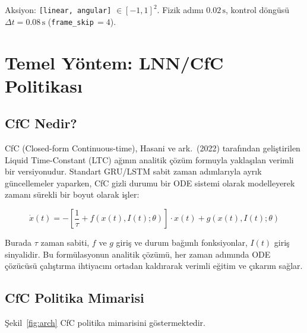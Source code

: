 \documentclass[11pt,a4paper]{article}
\newcommand{\code}[1]{\texttt{#1}}
\begin{document}
Aksiyon: \code{[linear, angular]} $\in [-1, 1]^2$.
Fizik adımı $0.02\,\text{s}$, kontrol döngüsü $\Delta t = 0.08\,\text{s}$
(\code{frame\_skip}$\,=4$).

\section{Temel Yöntem: LNN/CfC Politikası}

\subsection{CfC Nedir?}

CfC (Closed-form Continuous-time), Hasani ve ark.~(2022) tarafından geliştirilen
Liquid Time-Constant (LTC) ağının analitik çözüm formuyla
yaklaşılan verimli bir versiyonudur.
Standart GRU/LSTM sabit zaman adımlarıyla ayrık güncellemeler yaparken,
CfC gizli durumu bir ODE sistemi olarak modelleyerek zamanı sürekli bir boyut
olarak işler:

\begin{equation}
\dot{x}(t) = -\left[\frac{1}{\tau} + f(x(t), I(t); \theta)\right] \cdot x(t)
             + g(x(t), I(t); \theta)
\end{equation}

Burada $\tau$ zaman sabiti, $f$ ve $g$ giriş ve durum bağımlı fonksiyonlar,
$I(t)$ giriş sinyalidir.
Bu formülasyonun analitik çözümü, her zaman adımında ODE çözücüsü çalıştırma
ihtiyacını ortadan kaldırarak verimli eğitim ve çıkarım sağlar.

\subsection{CfC Politika Mimarisi}

Şekil~\ref{fig:arch} CfC politika mimarisini göstermektedir.
\end{document}
